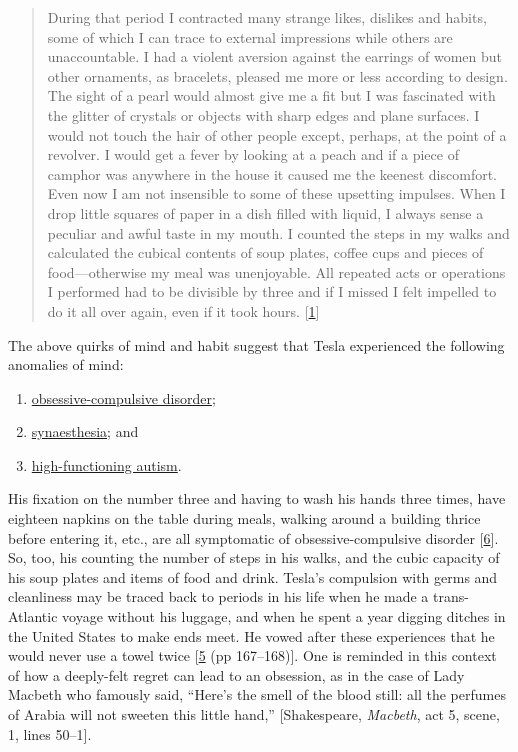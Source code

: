\documentclass[
  a4paper,
]{article}
\providecommand{\tightlist}{%
  \setlength{\itemsep}{0pt}\setlength{\parskip}{0pt}}
\begin{document}
\begin{quote}
During that period I contracted many strange likes, dislikes and habits,
some of which I can trace to external impressions while others are
unaccountable. I had a violent aversion against the earrings of women
but other ornaments, as bracelets, pleased me more or less according to
design. The sight of a pearl would almost give me a fit but I was
fascinated with the glitter of crystals or objects with sharp edges and
plane surfaces. I would not touch the hair of other people except,
perhaps, at the point of a revolver. I would get a fever by looking at a
peach and if a piece of camphor was anywhere in the house it caused me
the keenest discomfort. Even now I am not insensible to some of these
upsetting impulses. When I drop little squares of paper in a dish filled
with liquid, I always sense a peculiar and awful taste in my mouth. I
counted the steps in my walks and calculated the cubical contents of
soup plates, coffee cups and pieces of food---otherwise my meal was
unenjoyable. All repeated acts or operations I performed had to be
divisible by three and if I missed I felt impelled to do it all over
again, even if it took hours. {[}\protect\hyperlink{ref-john83}{1}{]}
\end{quote}

The above quirks of mind and habit suggest that Tesla experienced the
following anomalies of mind:

\begin{enumerate}
\tightlist
\item
  \href{https://en.wikipedia.org/wiki/Obsessive\%E2\%80\%93compulsive_disorder}{obsessive-compulsive
  disorder};
\item
  \href{https://en.wikipedia.org/wiki/Synesthesia}{synaesthesia}; and
\item
  \href{https://en.wikipedia.org/wiki/High-functioning_autism}{high-functioning
  autism}.
\end{enumerate}

His fixation on the number three and having to wash his hands three
times, have eighteen napkins on the table during meals, walking around a
building thrice before entering it, etc., are all symptomatic of
obsessive-compulsive disorder
{[}\protect\hyperlink{ref-tesla-wiki}{6}{]}. So, too, his counting the
number of steps in his walks, and the cubic capacity of his soup plates
and items of food and drink. Tesla's compulsion with germs and
cleanliness may be traced back to periods in his life when he made a
trans-Atlantic voyage without his luggage, and when he spent a year
digging ditches in the United States to make ends meet. He vowed after
these experiences that he would never use a towel twice
{[}\protect\hyperlink{ref-lomas99}{5} (pp 167--168){]}. One is reminded
in this context of how a deeply-felt regret can lead to an obsession, as
in the case of Lady Macbeth who famously said, ``Here's the smell of the
blood still: all the perfumes of Arabia will not sweeten this little
hand,'' {[}Shakespeare, \emph{Macbeth}, act 5, scene, 1, lines 50--1{]}.
\end{document}

